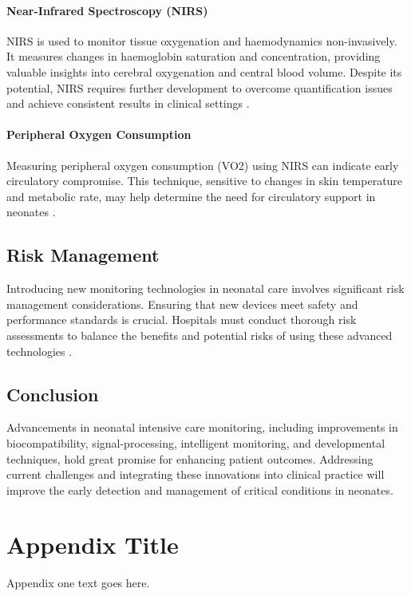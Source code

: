 \documentclass[12pt,journal,compsoc]{IEEEtran}
\begin{document}
\paragraph{Near-Infrared Spectroscopy (NIRS)}
NIRS is used to monitor tissue oxygenation and haemodynamics non-invasively. It measures changes in haemoglobin saturation and concentration, providing valuable insights into cerebral oxygenation and central blood volume. Despite its potential, NIRS requires further development to overcome quantification issues and achieve consistent results in clinical settings \cite{IEEEhowto:nicklin}.

\paragraph{Peripheral Oxygen Consumption}
Measuring peripheral oxygen consumption (VO2) using NIRS can indicate early circulatory compromise. This technique, sensitive to changes in skin temperature and metabolic rate, may help determine the need for circulatory support in neonates \cite{IEEEhowto:nicklin}.

\subsection{Risk Management}
Introducing new monitoring technologies in neonatal care involves significant risk management considerations. Ensuring that new devices meet safety and performance standards is crucial. Hospitals must conduct thorough risk assessments to balance the benefits and potential risks of using these advanced technologies \cite{IEEEhowto:nicklin}.

\subsection{Conclusion}
Advancements in neonatal intensive care monitoring, including improvements in biocompatibility, signal-processing, intelligent monitoring, and developmental techniques, hold great promise for enhancing patient outcomes. Addressing current challenges and integrating these innovations into clinical practice will improve the early detection and management of critical conditions in neonates.

\appendices
\section{Appendix Title}
Appendix one text goes here.
\end{document}

